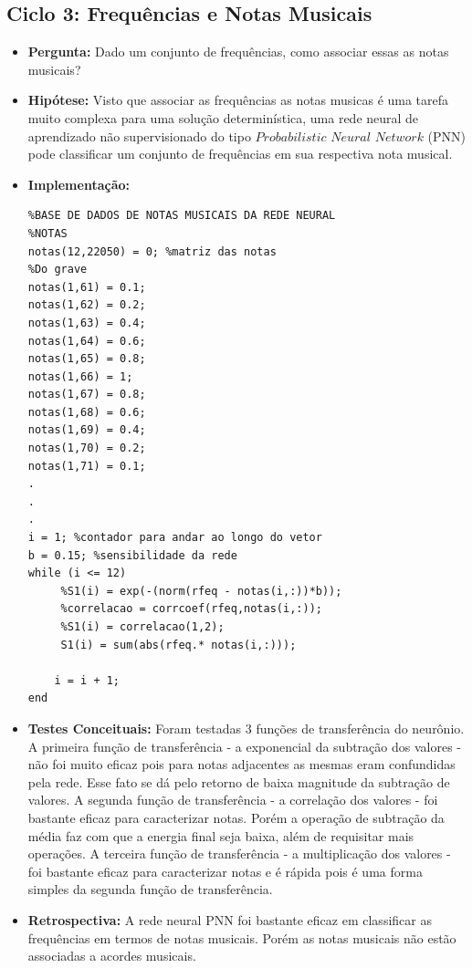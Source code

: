 \subsection{Ciclo 3: Frequências e Notas Musicais}
\label{subsec:ciclo_3}
\begin{itemize}
\item \textbf{Pergunta:} Dado um conjunto de frequências, como associar essas as notas musicais?
\item \textbf{Hipótese:} Visto que associar as frequências as notas musicas é uma tarefa muito complexa para uma solução determinística, uma rede neural de aprendizado não supervisionado do tipo $Probabilistic$ $Neural$ $Network$ (PNN) pode classificar um conjunto de frequências em sua respectiva nota musical.
\item \textbf{Implementação:} 
\begin{lstlisting}
%BASE DE DADOS DE NOTAS MUSICAIS DA REDE NEURAL
%NOTAS
notas(12,22050) = 0; %matriz das notas
%Do grave
notas(1,61) = 0.1;
notas(1,62) = 0.2;
notas(1,63) = 0.4;
notas(1,64) = 0.6;
notas(1,65) = 0.8;
notas(1,66) = 1;
notas(1,67) = 0.8;
notas(1,68) = 0.6;
notas(1,69) = 0.4;
notas(1,70) = 0.2;
notas(1,71) = 0.1;
.
.
.
i = 1; %contador para andar ao longo do vetor
b = 0.15; %sensibilidade da rede
while (i <= 12)
     %S1(i) = exp(-(norm(rfeq - notas(i,:))*b));
     %correlacao = corrcoef(rfeq,notas(i,:));
     %S1(i) = correlacao(1,2);    
     S1(i) = sum(abs(rfeq.* notas(i,:)));

    i = i + 1;
end

\end{lstlisting}
\item \textbf{Testes Conceituais:} Foram testadas 3 funções de transferência do neurônio. A primeira função de transferência - a exponencial da subtração dos valores - não foi muito eficaz pois para notas adjacentes as mesmas eram confundidas pela rede. Esse fato se dá pelo retorno de baixa magnitude da subtração de valores. A segunda função de transferência - a correlação dos valores - foi bastante eficaz para caracterizar notas. Porém a operação de subtração da média faz com que a energia final seja baixa, além de requisitar mais operações. A terceira função de transferência - a multiplicação dos valores - foi bastante eficaz para caracterizar notas e é rápida pois é uma forma simples da segunda função de transferência.
\item \textbf{Retrospectiva:} A rede neural PNN foi bastante eficaz em classificar as frequências em termos de notas musicais. Porém as notas musicais não estão associadas a acordes musicais.
\end{itemize}

